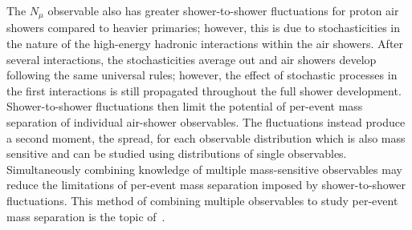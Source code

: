 The $N_{\mu}$ observable also has greater shower-to-shower fluctuations for proton air showers compared to heavier primaries; however, this is due to stochasticities in the nature of the high-energy hadronic interactions within the air showers.
After several interactions, the stochasticities average out and air showers develop following the same universal rules; however, the effect of stochastic processes in the first interactions is still propagated throughout the full shower development. 
Shower-to-shower fluctuations then limit the potential of per-event mass separation of individual air-shower observables.
The fluctuations instead produce a second moment, the spread, for each observable distribution which is also mass sensitive and can be studied using distributions of single observables.
Simultaneously combining knowledge of multiple mass-sensitive observables may reduce the limitations of per-event mass separation imposed by shower-to-shower fluctuations.
This method of combining multiple observables to study per-event mass separation is the topic of~.







